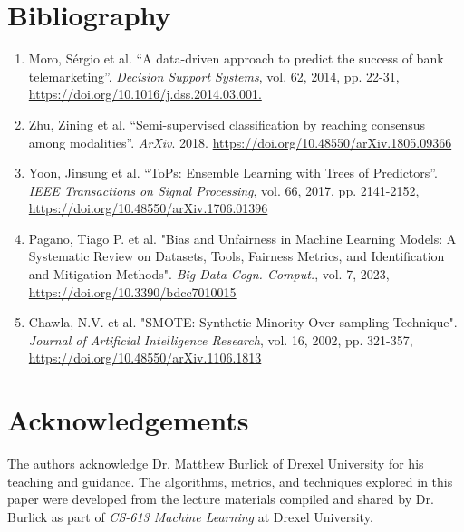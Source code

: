 \documentclass[11pt]{article}
\begin{document}
\newpage
\section{Bibliography }
\label{S:7}
\begin{enumerate}
\item Moro, Sérgio et al. “A data-driven approach to predict the success of bank telemarketing”. \textit{Decision Support Systems}, vol. 62, 2014, pp. 22-31, \url{https://doi.org/10.1016/j.dss.2014.03.001.}
\item Zhu, Zining et al. “Semi-supervised classification by reaching consensus among modalities”. \textit{ArXiv}. 2018. \url{https://doi.org/10.48550/arXiv.1805.09366} 
\item Yoon, Jinsung et al. “ToPs: Ensemble Learning with Trees of Predictors”. \textit{IEEE Transactions on Signal Processing}, vol. 66, 2017, pp. 2141-2152, \url{https://doi.org/10.48550/arXiv.1706.01396}
\item Pagano, Tiago P. et al. "Bias and Unfairness in Machine Learning Models: A Systematic Review on Datasets, Tools, Fairness Metrics, and Identification and Mitigation Methods". \textit{Big Data Cogn. Comput.}, vol. 7, 2023, \url{https://doi.org/10.3390/bdcc7010015}
\item Chawla, N.V. et al. "SMOTE: Synthetic Minority Over-sampling Technique". \textit{Journal of Artificial Intelligence Research}, vol. 16, 2002, pp. 321-357, \url{https://doi.org/10.48550/arXiv.1106.1813}
\end{enumerate}

\section{Acknowledgements }
\label{S:8}
The authors acknowledge Dr. Matthew Burlick of Drexel University for his teaching and guidance. The algorithms, metrics, and techniques explored in this paper were developed from the lecture materials compiled and shared by Dr. Burlick as part of \textit{CS-613 Machine Learning} at Drexel University.
\end{document}
